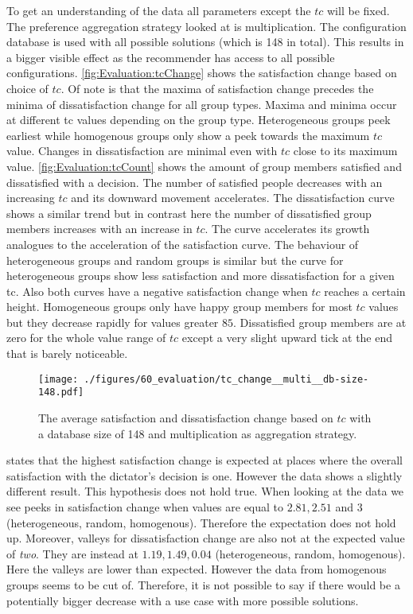 To get an understanding of the data all parameters except the $tc$ will be fixed. The preference aggregation strategy looked at is multiplication. The configuration database is used with all possible solutions (which is 148 in total). This results in a bigger visible effect as the recommender has access to all possible configurations. \autoref{fig:Evaluation:tcChange} shows the satisfaction change based on choice of $tc$. Of note is that the maxima of satisfaction change precedes the minima of dissatisfaction change for all group types. Maxima and minima occur at different tc values depending on the group type. Heterogeneous groups peek earliest while homogenous groups only show a peek towards the maximum $tc$ value. Changes in dissatisfaction are minimal even with $tc$ close to its maximum value. \autoref{fig:Evaluation:tcCount} shows the amount of group members satisfied and dissatisfied with a decision. The number of satisfied people decreases with an increasing $tc$ and its downward movement accelerates. The dissatisfaction curve shows a similar trend but in contrast here the number of dissatisfied group members increases with an increase in $tc$. The curve accelerates its growth analogues to the acceleration of the satisfaction curve. The behaviour of heterogeneous groups and random groups is similar but the curve for heterogeneous groups show less satisfaction and more dissatisfaction for a given tc. Also both curves have a negative satisfaction change when $tc$ reaches a certain height. Homogeneous groups only have happy group members for most $tc$ values but they decrease rapidly for values greater $85$. Dissatisfied group members are at zero for the whole value range of $tc$ except a very slight upward tick at the end that is barely noticeable.

\begin{figure}
    \centering
    \texttt{[image: ./figures/60\_evaluation/tc\_change\_\_multi\_\_db-size-148.pdf]}
    \caption{The average satisfaction and dissatisfaction change based on $tc$ with a database size of 148 and multiplication as aggregation strategy.}
    \label{fig:Evaluation:tcChange}
\end{figure}

 states that the highest satisfaction change is expected at places where the overall satisfaction with the dictator's decision is one. However the data shows a slightly different result. This hypothesis does not hold true. When looking at the data we see peeks in satisfaction change when values are equal to $2.81, 2.51$ and $3$ (heterogeneous, random, homogenous). Therefore the expectation does not hold up. Moreover, valleys for dissatisfaction change are also not at the expected value of \textit{two}. They are instead at $1.19, 1.49, 0.04$ (heterogeneous, random, homogenous). Here the valleys are lower than expected. However the data from homogenous groups seems to be cut of. Therefore, it is not possible to say if there would be a potentially bigger decrease with a use case with more possible solutions.

